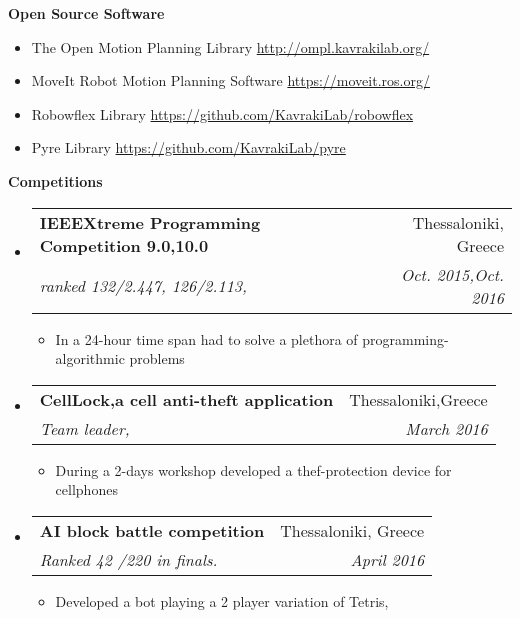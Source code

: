 \documentclass[letterpaper,11pt]{article}
\makeatletter
\newcommand{\resitem}[1]{\item #1 \vspace{-2pt}}
\newcommand{\resheading}[1]{{\large \colorbox{mygrey}{\begin{minipage}{\textwidth}{\textbf{#1 \vphantom{p\^{E}}}}\end{minipage}}}}
\newcommand{\ressubheading}[4]{
\begin{tabular*}{7.0in}{l@{\extracolsep{\fill}}r}
		\textbf{#1} & #2 \\
		\textit{#3} & \textit{#4} \\
\end{tabular*}\vspace{-6pt}}
\makeatother
\begin{document}
\resheading{Open Source Software}
\begin{itemize}
	\item The Open Motion Planning Library \url{http://ompl.kavrakilab.org/}
	\item MoveIt Robot Motion Planning Software  \url{https://moveit.ros.org/}
	\item Robowflex Library \url{https://github.com/KavrakiLab/robowflex}
	\item Pyre Library \url{https://github.com/KavrakiLab/pyre}
\end{itemize}	
\resheading{Competitions }
\begin{itemize}
	\item
	\ressubheading{IEEEXtreme Programming Competition 9.0,10.0}
	{Thessaloniki, Greece}
	{ranked 132/2.447, 126/2.113,
	}
	{Oct. 2015,Oct. 2016 }
	\begin{itemize}
		\resitem{In a 24-hour time span  had  to solve a plethora of programming- algorithmic problems}
	\end{itemize}
	\item
	\ressubheading{CellLock,a cell anti-theft application }{Thessaloniki,Greece}{Team leader,%
		}
		{March 2016}
	\begin{itemize}
		\resitem{During a 2-days workshop developed a thef-protection device for cellphones}
	\end{itemize}
	\item
	\ressubheading{AI block battle competition}{Thessaloniki, Greece}{Ranked 42 /220 in finals. %
		}{April 2016}
	\begin{itemize}
		\resitem{Developed a bot playing a 2 player variation of Tetris,
			}
	\end{itemize}
	
	
\end{itemize}
\end{document}
